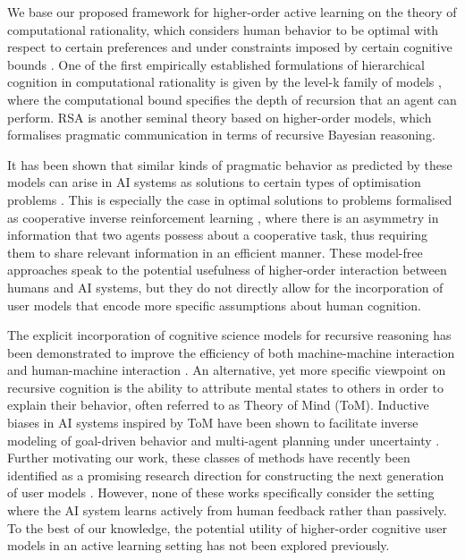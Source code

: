 \documentclass[letterpaper]{article} %
\begin{document}
We base our proposed framework for higher-order active learning on the theory of computational rationality, which considers human behavior to be optimal with respect to certain preferences and under constraints imposed by certain cognitive bounds \cite{gerchman2015computationalrationality}. One of the first empirically established formulations of hierarchical cognition in computational rationality is given by the level-k family of models \cite{Stahl1995level-k}, where the computational bound specifies the depth of recursion that an agent can perform. RSA \cite{goodman2016rsa} is another seminal theory based on higher-order models, which formalises pragmatic communication in terms of recursive Bayesian reasoning. 

It has been shown that similar kinds of pragmatic behavior as predicted by these models can arise in AI systems as solutions to certain types of optimisation problems \cite{malik2018efficientbellman, Fisac2020Pragmatic-pedagogic}. This is especially the case in optimal solutions to problems formalised as cooperative inverse reinforcement learning \cite{Hadfield-Menell2016cirl}, where there is an asymmetry in information that two agents possess about a cooperative task, thus requiring them to share relevant information in an efficient manner. These model-free approaches speak to the potential usefulness of higher-order interaction between humans and AI systems, but they do not directly allow for the incorporation of user models that encode more specific assumptions about human cognition. 

The explicit incorporation of cognitive science models for recursive reasoning has been demonstrated to improve the efficiency of both machine-machine interaction \cite{wen2018probabilistic, wu2021bayesiandelegation, Moreno2021NeuralRB} and human-machine interaction \cite{Ho2016showingversusdoing, Milli2019LiteralOP, Sumers2022howtotalk}. An alternative, yet more specific viewpoint on recursive cognition is the ability to attribute mental states to others in order to explain their behavior, often referred to as Theory of Mind (ToM). Inductive biases in AI systems inspired by ToM have been shown to facilitate inverse modeling of goal-driven behavior and multi-agent planning under uncertainty \cite{rabinowitz2018mtom, foerster2019bad, wu2021bayesiandelegation}. Further motivating our work, these classes of methods have recently been identified as a promising research direction for constructing the next generation of user models \cite{celikok2023modeling}. However, none of these works specifically consider the setting where the AI system learns actively from human feedback rather than passively. To the best of our knowledge, the potential utility of higher-order cognitive user models in an active learning setting has not been explored previously.
\end{document}

